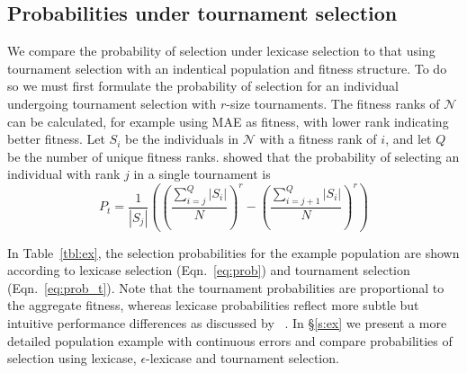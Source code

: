 \documentclass[twoside]{article}
\begin{document}
\subsection{Probabilities under tournament selection} We compare the probability of selection under lexicase selection to that using tournament selection with an indentical population and fitness structure. To do so we must first formulate the probability of selection for an individual undergoing tournament selection with $r$-size tournaments. The fitness ranks of $\mathcal{N}$ can be calculated, for example using MAE as fitness, with lower rank indicating better fitness. Let $S_i$ be the individuals in $\mathcal{N}$ with a fitness rank of $i$, and let $Q$ be the number of unique fitness ranks. \cite{xie_another_2007} showed that the probability of selecting an individual with rank $j$ in a single tournament is 
\begin{equation}\label{eq:prob_t}
P_t = \frac{1}{|S_j|}\left( \left(\frac{\sum_{i=j}^Q{|S_i|}}{N}\right)^r - \left(\frac{\sum_{i=j+1}^Q{|S_i|}}{N}\right)^r \right)
\end{equation}

In Table~\ref{tbl:ex}, the selection probabilities for the example population are shown according to lexicase selection (Eqn.~\ref{eq:prob}) and tournament selection (Eqn.~\ref{eq:prob_t}). Note that the tournament probabilities are proportional to the aggregate fitness, whereas lexicase probabilities reflect more subtle but intuitive performance differences as discussed by ~\cite{spector_assessment_2012}. In \S\ref{s:ex} we present a more detailed population example with continuous errors and compare probabilities of selection using lexicase, $\epsilon$-lexicase and tournament selection. 

%
\end{document}
